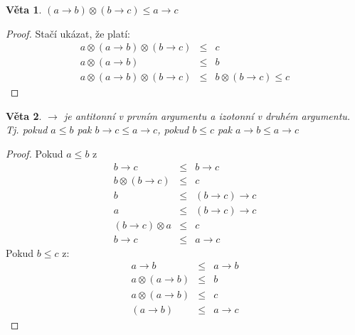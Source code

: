 \documentclass[10pt, a4paper, titlepage]{article}
\theoremstyle{note}
\newtheorem{veta}{Věta}
\begin{document}
\begin{veta}
$(a\rightarrow b) \otimes (b\rightarrow c)\leq a\rightarrow c$
\end{veta}
\begin{proof}
Stačí ukázat, že platí: \begin{eqnarray} a\otimes(a\rightarrow b)\otimes(b\rightarrow c)&\leq& c\nonumber\\
	      a\otimes(a\rightarrow b)&\leq&b\nonumber\\
	      a\otimes(a\rightarrow b)\otimes(b\rightarrow c)&\leq&b\otimes(b\rightarrow c) \leq c\nonumber
  \end{eqnarray}
\end{proof}
\begin{veta}
$\rightarrow$ je antitonní v prvním argumentu a izotonní v druhém argumentu. Tj. pokud $a\leq b$ pak $b\rightarrow c \leq a\rightarrow c$, pokud $b\leq c$ pak $a\rightarrow b\leq a\rightarrow c$
\end{veta}
\begin{proof}
Pokud $a\leq b$ z \begin{eqnarray} b\rightarrow c&\leq& b\rightarrow c\nonumber\\
				 b\otimes (b\rightarrow c)&\leq& c\nonumber\\
				 b &\leq& (b\rightarrow c)\rightarrow c\nonumber\\
				 a &\leq& (b\rightarrow c)\rightarrow c\nonumber\\
				 (b\rightarrow c)\otimes a &\leq&  c\nonumber\\
				 b\rightarrow c &\leq&  a \rightarrow c\nonumber
\end{eqnarray}
Pokud $b\leq c$ z:\begin{eqnarray}a\rightarrow b &\leq&a\rightarrow b \nonumber\\
				  a\otimes (a\rightarrow b) &\leq& b \nonumber\\
				  a\otimes (a\rightarrow b) &\leq& c \nonumber\\
				  (a\rightarrow b) &\leq& a\rightarrow c \nonumber
\end{eqnarray}
\end{proof}
\renewcommand{\indexcolumns}{3}
\printindex
\end{document}
